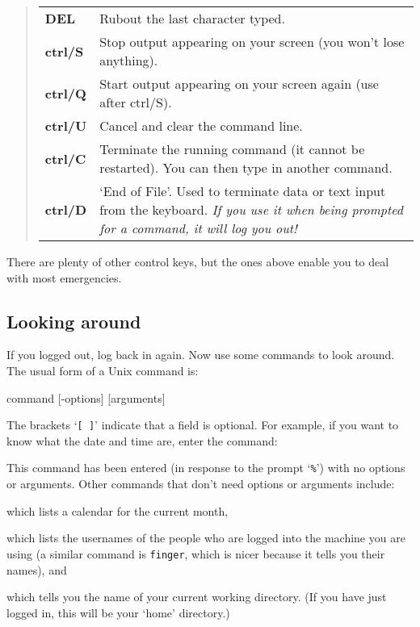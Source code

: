 \documentclass[twoside,11pt,nolof]{starlink}
\begin{document}
\begin{quote}
\begin{tabular}{lp{72mm}}

\textbf{DEL} & Rubout the last character typed.\\
\textbf{ctrl/S} & Stop output appearing on your screen (you won't lose
  anything).\\
\textbf{ctrl/Q} & Start output appearing on your screen again (use after
  ctrl/S).\\
\textbf{ctrl/U} & Cancel and clear the command line.\\
\textbf{ctrl/C} & Terminate the running command (it cannot be restarted).
  You can then type in another command.\\
\textbf{ctrl/D} & `End of File'. Used to terminate data or text input from
  the keyboard. \emph{If you use it when being prompted for a command, it will
  log you out!}
\end{tabular}
\end{quote}
There are plenty of other control keys, but the ones above enable you to deal
with most emergencies.

\subsection{Looking around}

If you logged out, log back in again.
Now use some commands to look around.
The usual form of a Unix command is:
\begin{terminalv}
command [-options] [arguments]
\end{terminalv}
The brackets `\texttt{[ ]}' indicate that a field is optional.
For example, if you want to know what the date and time are, enter the command:
\begin{terminalv}
\end{terminalv}
This command has been entered (in response to the prompt `\texttt{\%}') with no
options or arguments.
Other commands that don't need options or arguments include:
\begin{terminalv}
\end{terminalv}
which lists a calendar for the current month,
\begin{terminalv}
\end{terminalv}
which lists the usernames of the people who are logged into the machine you are
using (a similar command is \texttt{finger}, which is nicer because it tells you
their names), and
\begin{terminalv}
\end{terminalv}
which tells you the name of your current working directory.
(If you have just logged in, this will be your `home' directory.)
\end{document}
